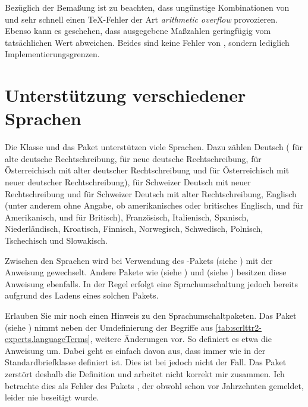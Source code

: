 Bezüglich der Bemaßung ist zu beachten, dass ungünstige Kombinationen von
 und  sehr schnell einen \TeX-Fehler der
Art \emph{arithmetic overflow} provozieren. Ebenso kann es geschehen, dass
ausgegebene Maßzahlen geringfügig vom tatsächlichen Wert abweichen. Beides
sind keine Fehler von , sondern lediglich
Implementierungsgrenzen.
%
\EndIndexGroup
%
\EndIndexGroup
%
\EndIndexGroup


\section{Unterstützung verschiedener Sprachen}
%
\BeginIndexGroup%
%
Die Klasse  und das Paket  unterstützen
viele Sprachen. Dazu zählen Deutsch ( für alte deutsche
Rechtschreibung,  für neue deutsche Rechtschreibung,
 für Österreichisch mit alter deutscher Rechtschreibung und
 für Österreichisch mit
neuer deutscher Rechtschreibung),
 für Schweizer Deutsch
mit neuer Rechtschreibung und  für Schweizer Deutsch mit
alter Rechtschreibung, Englisch (unter anderem  ohne Angabe,
ob amerikanisches oder britisches Englisch,  und
 für Amerikanisch,  und 
für Britisch), Französisch, Italienisch, Spanisch, Niederländisch, Kroatisch,
Finnisch, Norwegisch,
Schwedisch,
Polnisch,
Tschechisch und Slowakisch.

Zwischen den Sprachen wird bei Verwendung des
-Pakets (siehe \cite{package:babel}) mit
der Anweisung  gewechselt. Andere
Pakete wie  (siehe \cite{package:german})
und  (siehe \cite{package:ngerman})
besitzen diese Anweisung ebenfalls. In der Regel erfolgt eine
Sprachumschaltung jedoch bereits aufgrund des Ladens eines solchen Pakets.
\iffalse%
Näheres entnehmen Sie bitte der jeweiligen Anleitung.
\fi

Erlauben Sie mir noch einen Hinweis zu den
Sprachumschaltpaketen. Das Paket
 (siehe
\cite{package:french}) nimmt neben der Umdefinierung der Begriffe aus
\autoref{tab:scrlttr2-experts.languageTerms},
 weitere Änderungen vor. So
definiert es etwa die Anweisung  um. Dabei geht
es einfach davon aus, dass  immer wie in der
Standardbriefklasse  definiert ist. Dies ist bei \KOMAScript{}
jedoch nicht der Fall. Das Paket  zerstört deshalb die
Definition und arbeitet nicht korrekt mir \KOMAScript{} zusammen. Ich
betrachte dies als Fehler des Pakets , der obwohl schon vor
Jahrzehnten gemeldet, leider nie beseitigt wurde.
  
